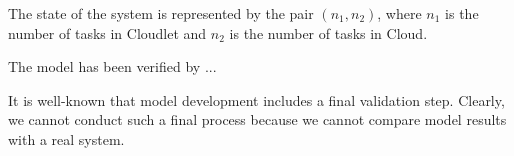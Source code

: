 The state of the system is represented by the pair $(n_{1},n_{2})$, where $n_{1}$ is the number of tasks in Cloudlet and $n_{2}$ is the number of tasks in Cloud.

The model has been verified by ... 

It is well-known that model development includes a final validation step. Clearly, we cannot conduct such a final process because we cannot compare model results with a real system.
